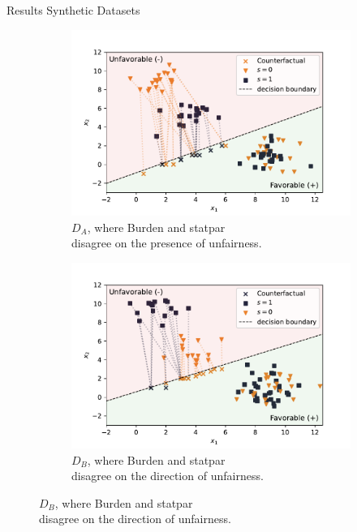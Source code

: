 \documentclass[aspectratio=169]{beamer}
\begin{document}
\begin{frame}{Results Synthetic Datasets}
\begin{figure}
    \centering
    \begin{subfigure}{0.49\textwidth}
        \includegraphics[width=\textwidth]{img/syndata-A}
        \caption{$D_A$, where Burden and statpar \\ disagree on the presence of unfairness.}
        \label{fig:syndatafavor}
    \end{subfigure}
    \begin{subfigure}{0.49\textwidth}
        \includegraphics[width=\textwidth]{img/syndata-B}
        \caption{$D_B$, where Burden and statpar \\ disagree on the direction of unfairness.}
        \label{fig:syndataunfavor}
    \end{subfigure}
\end{figure}
\end{frame}
\end{document}
